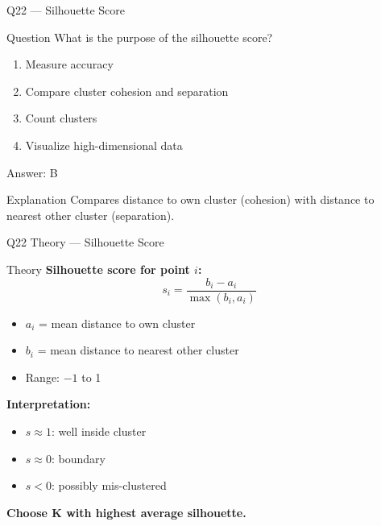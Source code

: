 \documentclass[aspectratio=169,8pt]{beamer}
\begin{document}
	\begin{frame}{Q22 --- Silhouette Score}
		\begin{block}{Question}
			What is the purpose of the silhouette score?
		\end{block}
		\begin{enumerate}[label=\Alph*.]
			\item Measure accuracy
			\item Compare cluster cohesion and separation
			\item Count clusters
			\item Visualize high-dimensional data
		\end{enumerate}
		\begin{exampleblock}{Answer: B}
		\end{exampleblock}
		\begin{block}{Explanation}
			Compares distance to own cluster (cohesion) with distance to nearest other cluster (separation).
		\end{block}
	\end{frame}
	
	\begin{frame}{Q22 Theory --- Silhouette Score}
		\begin{block}{Theory}
			\textbf{Silhouette score for point $i$:}
			\[
			s_i = \frac{b_i - a_i}{\max(b_i, a_i)}
			\]
			\begin{itemize}
				\item $a_i$ = mean distance to own cluster
				\item $b_i$ = mean distance to nearest other cluster
				\item Range: $-1$ to 1
			\end{itemize}
			\textbf{Interpretation:}
			\begin{itemize}
				\item $s \approx 1$: well inside cluster
				\item $s \approx 0$: boundary
				\item $s < 0$: possibly mis-clustered
			\end{itemize}
			\textbf{Choose K with highest average silhouette.}
		\end{block}
	\end{frame}
	
\end{document}
